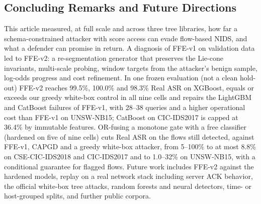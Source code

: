 \subsection{Concluding Remarks and Future Directions}
\label{sec:concluding_remarks}

This article measured, at full scale and across three tree libraries, how far a schema-constrained attacker with score access can evade flow-based NIDS, and what a defender can promise in return. A diagnosis of FFE-v1 on validation data led to FFE-v2: a re-segmentation generator that preserves the Lie-cone invariants, multi-scale probing, window targets from the attacker's benign sample, log-odds progress and cost refinement. In one frozen evaluation (not a clean hold-out) FFE-v2 reaches 99.5\%, 100.0\% and 98.3\% Real ASR on XGBoost, equals or exceeds our greedy white-box control in all nine cells and repairs the LightGBM and CatBoost failures of FFE-v1, with 28--38 queries and a higher operational cost than FFE-v1 on UNSW-NB15; CatBoost on CIC-IDS2017 is capped at 36.4\% by immutable features. OR-fusing a monotone gate with a free classifier (hardened on five of nine cells) cuts Real ASR on the flows still detected, against FFE-v1, CAPGD and a greedy white-box attacker, from 5--100\% to at most 8.8\% on CSE-CIC-IDS2018 and CIC-IDS2017 and to 1.0--32\% on UNSW-NB15, with a conditional guarantee for flagged flows. Future work includes FFE-v2 against the hardened models, replay on a real network stack including server ACK behavior, the official white-box tree attacks, random forests and neural detectors, time- or host-grouped splits, and further public corpora.
